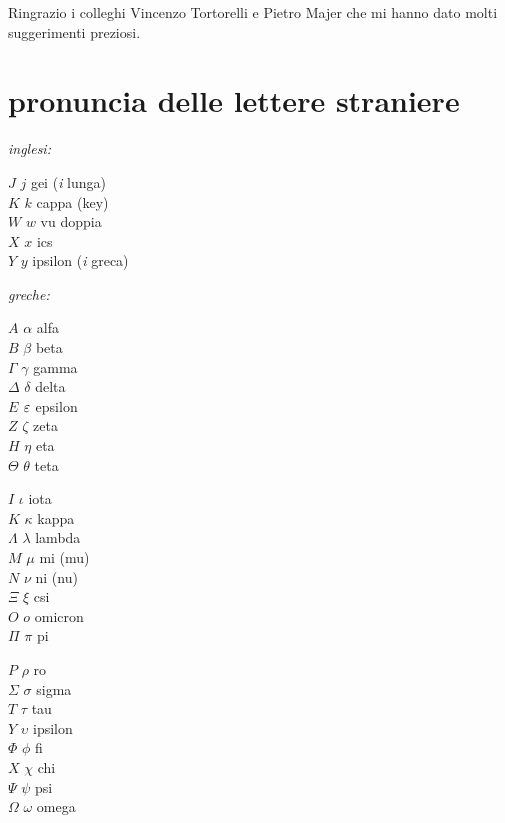 Ringrazio i colleghi Vincenzo Tortorelli e Pietro Majer
che mi hanno dato molti suggerimenti preziosi.

\section*{pronuncia delle lettere straniere}

\emph{inglesi:}
\begin{center}
\begin{minipage}{3cm}
$J$ $j$ gei (\emph{i} lunga) \\
$K$ $k$ cappa (key) \\
$W$ $w$ vu doppia \\
$X$ $x$ ics \\
$Y$ $y$ ipsilon (\emph{i} greca) 
\end{minipage}
\end{center}
%
\emph{greche:}
\begin{center}
\begin{minipage}{3cm}
$A$ $\alpha$ alfa \index{$\alpha$} \\
$B$ $\beta$ beta \index{$\beta$}\\
$\Gamma$ $\gamma$ gamma \index{$\gamma$} \\
$\Delta$ $\delta$ delta \index{$\delta$} \\
$E$ $\eps$ epsilon \index{$\eps$} \\
$Z$ $\zeta$ zeta\footnotemark[1] \\
$H$ $\eta$ eta  \\
$\Theta$ $\theta$ teta \index{$\theta$}
\end{minipage}%
\begin{minipage}{3cm}
$I$ $\iota$ iota  \\
$K$ $\kappa$ kappa\footnotemark[2]  \\
$\Lambda$ $\lambda$ lambda \index{$\lambda$} \\
$M$ $\mu$ mi (mu) \index{$\mu$} \\
$N$ $\nu$ ni (nu) \index{$\nu$} \\
$\Xi$ $\xi$ csi  \\
$O$ $o$ omicron  \\
$\Pi$ $\pi$ pi\footnotemark[3] \index{$\pi$}
\end{minipage}%
%
\begin{minipage}{3cm}
$P$ $\rho$ ro \index{$\rho$} \\
$\Sigma$ $\sigma$ sigma \index{$\sigma$} \index{$\Sigma$} \\
$T$ $\tau$ tau  \index{$\tau$}\\
$Y$ $\upsilon$ ipsilon\footnotemark[4]\\
$\Phi$ $\phi$ fi \index{$\phi$} \\
$X$ $\chi$ chi \index{$\chi$} \\
$\Psi$ $\psi$ psi \index{$\psi$} \\
$\Omega$ $\omega$ omega \index{$\omega$}
\end{minipage}
\end{center}
